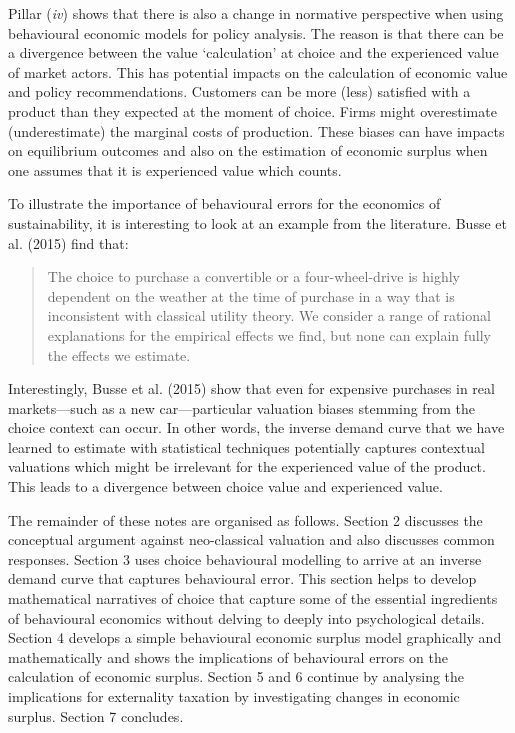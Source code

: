 \documentclass[
]{book}
\begin{document}
Pillar (\emph{iv}) shows that there is also a change in normative perspective when using behavioural economic models for policy analysis. The reason is that there can be a divergence between the value `calculation' at choice and the experienced value of market actors. This has potential impacts on the calculation of economic value and policy recommendations. Customers can be more (less) satisfied with a product than they expected at the moment of choice. Firms might overestimate (underestimate) the marginal costs of production. These biases can have impacts on equilibrium outcomes and also on the estimation of economic surplus when one assumes that it is experienced value which counts.

To illustrate the importance of behavioural errors for the economics of sustainability, it is interesting to look at an example from the literature. Busse et al. (2015) find that:

\begin{quote}
The choice to purchase a convertible or a four-wheel-drive is highly dependent on the weather at the time of purchase in a way that is inconsistent with classical utility theory. We consider a range of rational explanations for the empirical effects we find, but none can explain fully the effects we estimate.
\end{quote}

Interestingly, Busse et al. (2015) show that even for expensive purchases in real markets---such as a new car---particular valuation biases stemming from the choice context can occur. In other words, the inverse demand curve that we have learned to estimate with statistical techniques potentially captures contextual valuations which might be irrelevant for the experienced value of the product. This leads to a divergence between choice value and experienced value.

The remainder of these notes are organised as follows. Section 2 discusses the conceptual argument against neo-classical valuation and also discusses common responses. Section 3 uses choice behavioural modelling to arrive at an inverse demand curve that captures behavioural error. This section helps to develop mathematical narratives of choice that capture some of the essential ingredients of behavioural economics without delving to deeply into psychological details. Section 4 develops a simple behavioural economic surplus model graphically and mathematically and shows the implications of behavioural errors on the calculation of economic surplus. Section 5 and 6 continue by analysing the implications for externality taxation by investigating changes in economic surplus. Section 7 concludes.
\end{document}
